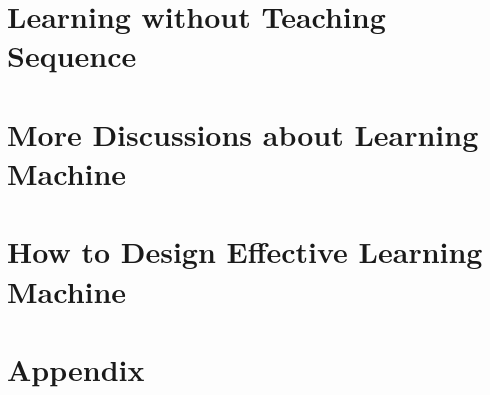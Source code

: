 \documentclass[twoside]{article}      %
\begin{document}
\section{Learning without Teaching Sequence}\label{table}

\section{More Discussions about Learning Machine}\label{table}

\section{How to Design Effective Learning Machine}\label{table}


\begin{thebibliography}{99}

\end{thebibliography}

\section*{Appendix}\label{table}

\end{document}

